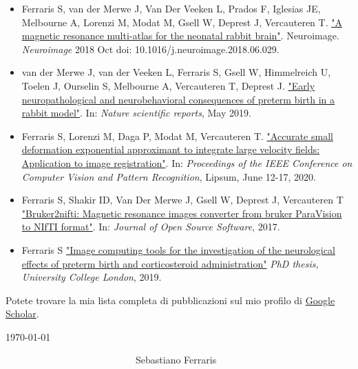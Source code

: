 \documentclass[10pt,A4,english]{article}
\begin{document}
\begin{paracol}{2}
\begin{rightcolumn}
\begin{itemize}[leftmargin=*]
\item Ferraris S, van der Merwe J, Van Der Veeken L, Prados F, Iglesias JE, Melbourne A, Lorenzi M, Modat M, Gsell W, Deprest J, Vercauteren T. 
\href{https://www.ncbi.nlm.nih.gov/pmc/articles/PMC6203700/}{"A magnetic resonance multi-atlas for the neonatal rabbit brain"}.
Neuroimage. \textit{Neuroimage} 2018 Oct doi: 10.1016/j.neuroimage.2018.06.029.
\item van der Merwe J, van der Veeken L, Ferraris S, Gsell W, Himmelreich U, Toelen J, Ourselin S, Melbourne A, Vercauteren T, Deprest J.  
\href{https://www.nature.com/articles/s41598-019-39922-8}{"Early neuropathological and neurobehavioral consequences of preterm birth in a rabbit model"}. 
In: \textit{Nature scientific reports}, May 2019.
\item Ferraris S, Lorenzi M, Daga P, Modat M, Vercauteren T. 
\href{https://ieeexplore.ieee.org/document/7789554}{"Accurate small deformation exponential approximant to integrate large velocity fields: Application to image registration"}. 
In: \textit{Proceedings of the IEEE Conference on Computer Vision and Pattern Recognition}, Lipsum, June 12-17, 2020.
\item Ferraris S, Shakir ID, Van Der Merwe J, Gsell W, Deprest J, Vercauteren T 
\href{https://joss.theoj.org/papers/10.21105/joss.00354}{"Bruker2nifti: Magnetic resonance images converter from bruker ParaVision to NIfTI format"}. 
In: \textit{Journal of Open Source Software}, 2017.
\item Ferraris S 
\href{https://discovery.ucl.ac.uk/id/eprint/10072833/}{"Image computing tools for the investigation of the neurological effects of preterm birth and corticosteroid administration"} 
\textit{PhD thesis, University College London}, 2019.


\end{itemize}
\mbox{}
\vfill
Potete trovare la mia lista completa di pubblicazioni sul mio profilo di \href{https://scholar.google.com/citations?user=1tAeAI0AAAAJ&hl=en}{Google Scholar}.
\mbox{}
\vfill
\mbox{}
\vfill
\mbox{}
\vfill
\mbox{}
\vfill
\mbox{}
\vfill
\mbox{}
\vfill
\mbox{}
\vfill
\mbox{}
\vfill
\mbox{}
\vfill
\mbox{}
\vfill
\mbox{}
\vfill
\mbox{}
\vfill
\mbox{}
\vfill
\mbox{}
\vfill
\mbox{}


\today     \hspace{1cm}   \hrulefill

\hspace*{30mm}\phantom{Lorem, \today }~~~~~~~~~~~~~~~~~~~~~~~~~~~Sebastiano Ferraris

\end{rightcolumn}
\end{paracol}
\end{document}
